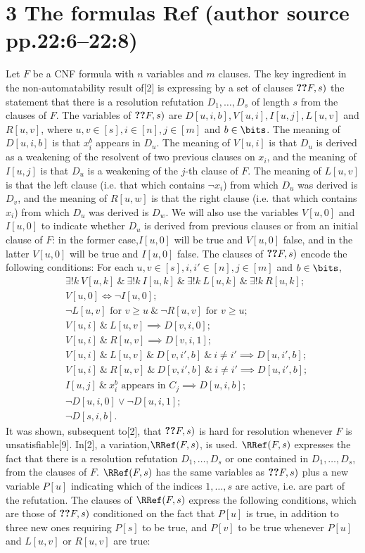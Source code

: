 \section*{3 The formulas Ref (author source pp.22:6--22:8)}
Let $F$ be a CNF formula with $n$ variables and $m$ clauses. The key ingredient in the non-automatability result of[2] is expressing by a set of clauses $\Ref(F,s)$ the statement that there is a resolution refutation $D_1,\ldots,D_s$ of length $s$ from the clauses of $F$.
The variables of $\Ref(F,s)$ are $D[u,i,b],V[u,i],I[u,j],L[u,v]$ and $R[u,v]$, where $u,v\in[s],i\in[n],j\in[m]$ and $b\in\bits$. The meaning of $D[u,i,b]$ is that $x_i^b$ appears in $D_u$. The meaning of $V[u,i]$ is that $D_u$ is derived as a weakening of the resolvent of two previous clauses on $x_i$, and the meaning of $I[u,j]$ is that $D_u$ is a weakening of the $j$-th clause of $F$. The meaning of $L[u,v]$ is that the left clause (i.e. that which contains $\neg x_i$) from which $D_u$ was derived is $D_v$, and the meaning of $R[u,w]$ is that the right clause (i.e. that which contains $x_i$) from which $D_u$ was derived is $D_w$. We will also use the variables $V[u,0]$ and $I[u,0]$ to indicate whether $D_u$ is derived from previous clauses or from an initial clause of $F$: in the former case,$I[u,0]$ will be true and $V[u,0]$ false, and in the latter $V[u,0]$ will be true and $I[u,0]$ false. The clauses of $\Ref(F,s)$ encode the following conditions: For each $u,v\in[s],i,i'\in[n],j\in[m]$ and $b\in\bits$,
\begin{align*}
&\exists!k\ V[u,k]\ \&\ \exists!k\ I[u,k]\ \&\ \exists!k\ L[u,k]\ \&\ \exists!k\ R[u,k];\tag{3.1}\\
&V[u,0]\iff\neg I[u,0];\tag{3.2}\\
&\neg L[u,v]\text{ for }v\ge u\ \&\ \neg R[u,v]\text{ for }v\ge u;\tag{3.3}\\
&V[u,i]\ \&\ L[u,v]\implies D[v,i,0];\tag{3.4}\\
&V[u,i]\ \&\ R[u,v]\implies D[v,i,1];\tag{3.5}\\
&V[u,i]\ \&\ L[u,v]\ \&\ D[v,i',b]\ \&\ i\ne i'\implies D[u,i',b];\tag{3.6}\\
&V[u,i]\ \&\ R[u,v]\ \&\ D[v,i',b]\ \&\ i\ne i'\implies D[u,i',b];\tag{3.7}\\
&I[u,j]\ \&\ x_i^b\text{ appears in }C_j\implies D[u,i,b];\tag{3.8}\\
&\neg D[u,i,0]\vee\neg D[u,i,1];\tag{3.9}\\
&\neg D[s,i,b].\tag{3.10}
\end{align*}
It was shown, subsequent to[2], that $\Ref(F,s)$ is hard for resolution whenever $F$ is unsatisfiable[9]. In[2], a variation,$\RRef(F,s)$, is used. $\RRef(F,s)$ expresses the fact that there is a resolution refutation $D_1,\ldots,D_s$ or one contained in $D_1,\ldots,D_s$, from the clauses of $F$. $\RRef(F,s)$ has the same variables as $\Ref(F,s)$ plus a new variable $P[u]$ indicating which of the indices $1,\ldots,s$ are active, i.e. are part of the refutation. The clauses of $\RRef(F,s)$ express the following conditions, which are those of $\Ref(F,s)$ conditioned on the fact that $P[u]$ is true, in addition to three new ones requiring $P[s]$ to be true, and $P[v]$ to be true whenever $P[u]$ and $L[u,v]$ or $R[u,v]$ are true:
